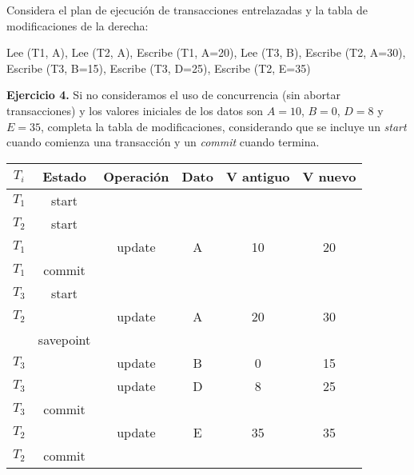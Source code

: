 \documentclass[12pt]{report}
\begin{document}
Considera el plan de ejecución de transacciones entrelazadas y la tabla de modificaciones de la derecha:

Lee (T1, A), Lee (T2, A), Escribe (T1, A=20), Lee (T3, B),
Escribe (T2, A=30), Escribe (T3, B=15), Escribe (T3, D=25),
Escribe (T2, E=35)


\textbf{Ejercicio 4.} Si no consideramos el uso de concurrencia (sin abortar transacciones) y los valores iniciales de los datos son $A=10$, $B=0$, $D=8$ y $E=35$, completa la tabla de modificaciones, considerando que se incluye un \textit{start} cuando comienza una transacción y un \textit{commit} cuando termina.

\begin{center}
\begin{tabular}{|c|c|c|c|c|c|}
\hline 
$T_i$ & Estado & Operación & Dato & V antiguo & V nuevo \\ 
\hline 
$T_1$ & start &   &   &   &   \\ 
\hline 
$T_2$ & start &   &   &   &   \\ 
\hline 
$T_1$ &  & update & A & 10 & 20 \\ 
\hline 
$T_1$ & commit &  &  &  &  \\ 
\hline 
$T_3$ & start &  &  &  &  \\ 
\hline 
$T_2$ &  & update & A & 20 & 30 \\ 
\hline 
 & savepoint &  &  &  &  \\ 
\hline 
$T_3$ &  & update & B & 0 & 15 \\ 
\hline 
$T_3$ &  & update & D & 8 & 25 \\ 
\hline 
$T_3$ & commit &  &  &  &  \\ 
\hline 
$T_2$ &  & update  & E & 35 & 35 \\ 
\hline 
$T_2$ & commit &  &  &  &  \\ 
\hline 
\end{tabular} 
\end{center}
\end{document}

